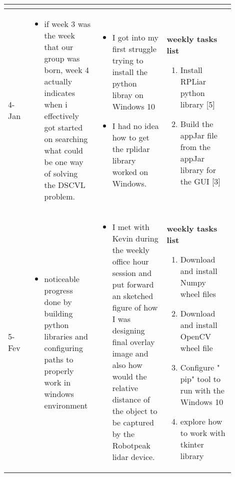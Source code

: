 \begin{longtable}{|l|p{0.3\linewidth}|p{0.3\linewidth}|p{0.3\linewidth}|}
\begin{itemize}
\end{itemize}
			\\\hline

		4-Jan	&
\begin{itemize}
\item if week 3 was the week that our group was born, week 4 actually indicates when i effectively got started on searching what could be one way of solving the DSCVL problem.
\end{itemize}
			&
\begin{itemize}
\item I got into my first struggle trying to install the python libray on Windows 10
\item I had no idea how to get the rplidar library worked on Windows.  

\end{itemize}
			&
	\textbf{ weekly tasks list}  	
\begin{enumerate}
\item Install RPLiar python library [5]
\item Build the appJar  file from the appJar library for the GUI [3] 
\end{enumerate}
			\\\hline

		5-Fev 	&
\begin{itemize}
\item noticeable progress done by building python libraries and configuring paths to properly work in windows environment 
\end{itemize}
			&
\begin{itemize}
\item I met with Kevin during the weekly office hour session and put forward an sketched figure of how I was designing  final overlay image and also how would the relative distance of the object to be captured by the Robotpeak lidar device. 
\end{itemize}
			&
	\textbf{ weekly tasks list}
	\begin{enumerate}
	\item Download and install Numpy  wheel files
	\item Download and install OpenCV wheel file
	\item Configure " pip" tool to run with the Windows 10
	\item explore how to work with tkinter library  
	\end{enumerate}

			\\\hline


\end{longtable}
